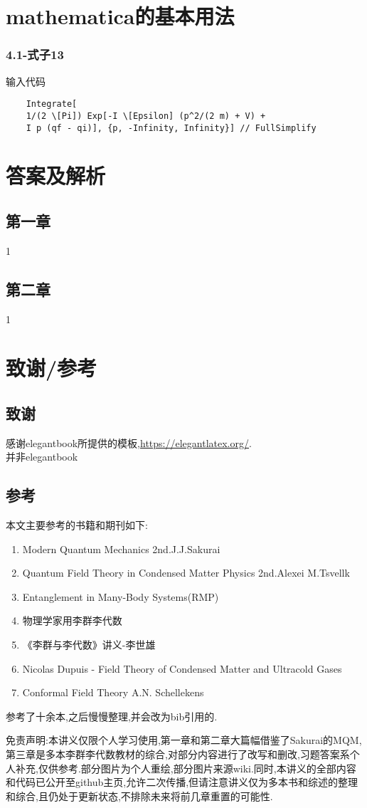 \chapter{mathematica的基本用法}
\subsection*{4.1-式子13}
输入代码
\begin{lstlisting}
    Integrate[
    1/(2 \[Pi]) Exp[-I \[Epsilon] (p^2/(2 m) + V) + 
    I p (qf - qi)], {p, -Infinity, Infinity}] // FullSimplify
\end{lstlisting}

\chapter{答案及解析}
\section{第一章}
1
\section{第二章}
1
\chapter{致谢/参考}
\section{致谢}
感谢elegantbook所提供的模板,\href{https://elegantlatex.org/}{https://elegantlatex.org/}.\\
并非elegantbook

\section{参考}
本文主要参考的书籍和期刊如下:
\begin{enumerate}
    \item Modern Quantum Mechanics 2nd.J.J.Sakurai
    \item Quantum Field Theory in Condensed Matter Physics 2nd.Alexei M.Tsvellk
    \item Entanglement in Many-Body Systems(RMP)
    \item 物理学家用李群李代数
    \item 《李群与李代数》讲义-李世雄
    \item Nicolas Dupuis - Field Theory of Condensed Matter and Ultracold Gases
    \item Conformal Field Theory A.N. Schellekens
\end{enumerate}
参考了十余本,之后慢慢整理,并会改为bib引用的.

免责声明:本讲义仅限个人学习使用,第一章和第二章大篇幅借鉴了Sakurai的MQM,第三章是多本李群李代数教材的综合,对部分内容进行了改写和删改,习题答案系个人补充,仅供参考.部分图片为个人重绘,部分图片来源wiki.同时,本讲义的全部内容和代码已公开至github主页,允许二次传播,但请注意讲义仅为多本书和综述的整理和综合,且仍处于更新状态,不排除未来将前几章重置的可能性.
